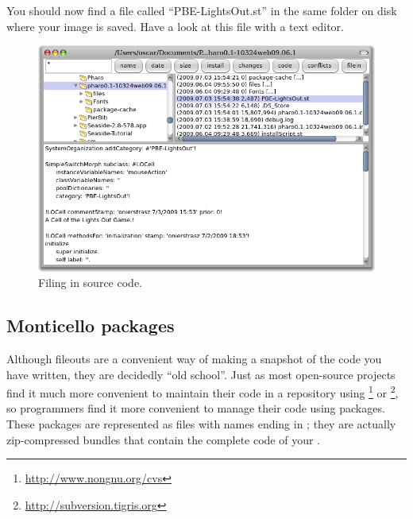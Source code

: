 \documentclass[a4paper,10pt,twoside]{book}
\begin{document}
You should now find a file called ``PBE-LightsOut.st'' in the same folder on disk where your image is saved.
Have a look at this file with a text editor.


\begin{figure}[ht]
\centerline {\includegraphics[width=\textwidth]{FileIn}}
\caption{Filing in \pharo source code.
}
\end{figure}

\subsection{Monticello packages}
Although fileouts are a convenient way of making a snapshot of the code you have written, they are decidedly ``old school''.
Just as most open-source projects find it much more convenient to maintain their code in a repository using \footnote{\url{http://www.nongnu.org/cvs}} or \footnote{\url{http://subversion.tigris.org}},
so \pharo programmers find it more convenient to manage their code using  packages. 
These packages are represented as files with names ending in ; they are actually zip-compressed bundles that contain the complete code of your .
\end{document}
